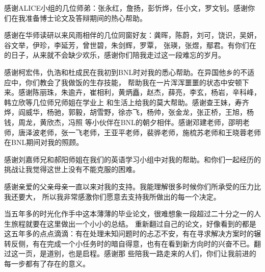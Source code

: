 感谢ALICE小组的几位师弟：张永红，詹扬，彭忻烨，任小文，罗文钊。感谢你们在我准备博士论文及答辩期间的热心帮助。

感谢在华师读研以来风雨相伴的几位同窗好友：龚晖，陈蔚，刘可，饶识，吴妍，谷文举，伊珍，李延芳，曾世碧，朱剑辉，罗覃，
张瑛，张煜，鄢君。有你们在的日子，从来就不会缺少欢乐，感谢你们陪我走过这一段难忘的岁月。

感谢柯宏伟，仇浩和杜成民在我初到BNL时对我的悉心帮助。在异国他乡的不适应中，你们教会了我做饭的生存技能，
帮助我在一片浑浑噩噩的状态中安顿下来。感谢陈丽珠，朱逾卉，崔相利，黄炳矗，赵杰，薛亮，李玄，杨岩，辛科峰，韩立欣等几位师兄师姐在学业上
和生活上给我的莫大帮助。感谢查王妹，寿齐烨，阎威华，杨驰，郭毅，胡雪野，徐亦飞，杨帅，张金龙，张正桥，王旭，杨钱，周龙，黄欣杰，冯照
等小伙伴在BNL的朝夕相伴。感谢邓建老师，邵明老师，唐泽波老师，张一飞老师，王亚平老师，裴骅老师，施梳苏老师和王晓蓉老师在BNL期间对我的照顾。

感谢刘嘉师兄和郝阳师姐在我们的英语学习小组中对我的帮助。和你们一起经历的挑战让我觉得这世上没有不能克服的困难。


感谢亲爱的父亲母亲一直以来对我的支持。我能理解很多时候你们所承受的压力比我还要大，
所以我非常感激你们愿意去支持我所做出的每一个决定。


当五年多的时光化作手中这本薄薄的毕业论文，很难想象一段超过二十分之一的人生旅程就要在这里做出一个小小的总结。
重新翻过自己的论文，好像看到的都是这五年多的点点滴滴：有在处理未知问题时的忐忑不安，有在寻求解决方案时的辗
转反侧，有在完成一个小任务时的暗自得意，也有在看到新方向时的兴奋不已。翻过这一页，是道别，也是启程。感谢那
些陪我一路走来的人们，你们让我前进的每一步都有了存在的意义。